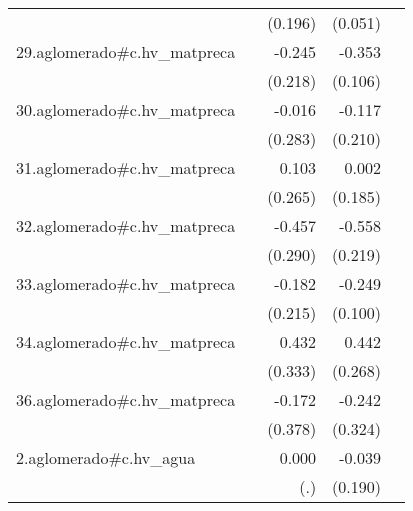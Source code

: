 {\begin{longtable}{l*{4}{D{.}{.}{-1}}}
            &                     &     (0.196)         &     (0.051)         &                     \\
\addlinespace
29.aglomerado#c.hv\_matpreca&                     &      -0.245         &      -0.353\sym{***}&                     \\
            &                     &     (0.218)         &     (0.106)         &                     \\
\addlinespace
30.aglomerado#c.hv\_matpreca&                     &      -0.016         &      -0.117         &                     \\
            &                     &     (0.283)         &     (0.210)         &                     \\
\addlinespace
31.aglomerado#c.hv\_matpreca&                     &       0.103         &       0.002         &                     \\
            &                     &     (0.265)         &     (0.185)         &                     \\
\addlinespace
32.aglomerado#c.hv\_matpreca&                     &      -0.457         &      -0.558\sym{*}  &                     \\
            &                     &     (0.290)         &     (0.219)         &                     \\
\addlinespace
33.aglomerado#c.hv\_matpreca&                     &      -0.182         &      -0.249\sym{*}  &                     \\
            &                     &     (0.215)         &     (0.100)         &                     \\
\addlinespace
34.aglomerado#c.hv\_matpreca&                     &       0.432         &       0.442         &                     \\
            &                     &     (0.333)         &     (0.268)         &                     \\
\addlinespace
36.aglomerado#c.hv\_matpreca&                     &      -0.172         &      -0.242         &                     \\
            &                     &     (0.378)         &     (0.324)         &                     \\
\addlinespace
2.aglomerado#c.hv\_agua&                     &       0.000         &      -0.039         &                     \\
            &                     &         (.)         &     (0.190)         &                     \\

\end{longtable}}
